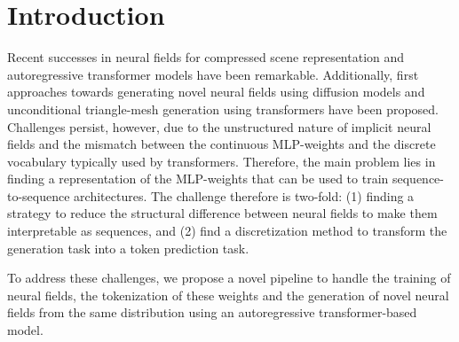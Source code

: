 \section{Introduction}
\label{sec:intro}

Recent successes in neural fields for compressed scene representation and autoregressive transformer models have been remarkable.
Additionally, first approaches towards generating novel neural fields using diffusion models \cite{erkoç2023hyperdiffusion} and unconditional triangle-mesh generation using transformers \cite{siddiqui2023meshgpt} have been proposed.
Challenges persist, however, due to the unstructured nature of implicit neural fields and the mismatch between the continuous MLP-weights and the discrete vocabulary typically used by transformers.
Therefore, the main problem lies in finding a representation of the MLP-weights that can be used to train sequence-to-sequence architectures.
The challenge therefore is two-fold: (1) finding a strategy to reduce the structural difference between neural fields to make them interpretable as sequences, and (2) find a discretization method to transform the generation task into a token prediction task.

To address these challenges, we propose a novel pipeline to handle the training of neural fields, the tokenization of these weights and the generation of novel neural fields from the same distribution using an autoregressive transformer-based model.



